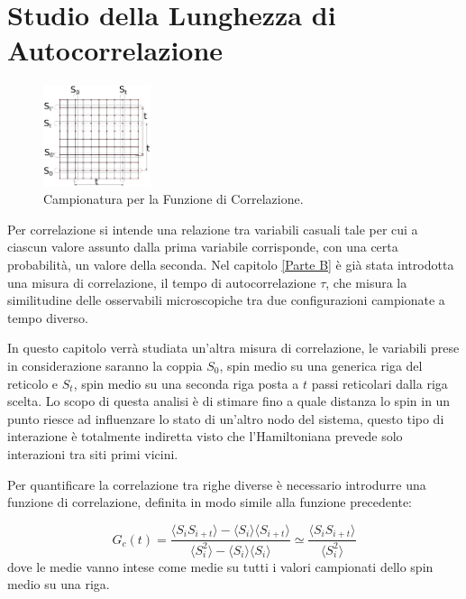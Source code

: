 \section{Studio della Lunghezza di Autocorrelazione}\label{Parte C}
\begin{figure}
\vspace{-25pt} 
  \begin{center}
	\includegraphics[width=0.28\textwidth]{Immagini/Reticolo}
  \end{center}
       \vspace{-15pt} 
       \caption[Campionatura per la Funzione di Correlazione.]{\footnotesize Campionatura per la Funzione di Correlazione.}\label{fig: simmetrie}
       \vspace{-15pt} 
\end{figure}

Per correlazione si intende una relazione tra variabili casuali tale per cui a ciascun valore assunto dalla prima variabile corrisponde, con una certa probabilità, un valore della seconda.
Nel capitolo \ref{Parte B} è già stata introdotta una misura di correlazione, il tempo di autocorrelazione $\tau$, che misura la similitudine delle osservabili microscopiche tra due configurazioni campionate a tempo diverso.

In questo capitolo verrà studiata un'altra misura di correlazione, le variabili prese in considerazione saranno la coppia $S_0$, spin medio su una  generica riga del reticolo e $S_t$, spin medio su una seconda riga posta a $t$ passi reticolari dalla riga scelta. 
Lo scopo di questa analisi è di stimare fino a quale distanza lo spin in un punto riesce ad influenzare lo stato di un'altro nodo del sistema, questo tipo di interazione è totalmente indiretta visto che l'Hamiltoniana prevede solo interazioni tra siti primi vicini.

Per quantificare la correlazione tra righe diverse è necessario introdurre una funzione di correlazione, definita in modo simile alla funzione precedente:

\begin{equation}\label{eq: G_c}
G_c(t) = \dfrac{\langle S_i S_{i+t}\rangle - \langle S_i\rangle \langle S_{i+t}\rangle  }{\langle S_i^2\rangle - \langle S_i\rangle \langle S_{i}\rangle} \simeq \dfrac{\langle S_i S_{i+t}\rangle}{\langle S_i^2\rangle}
\end{equation}
dove le medie vanno intese come medie su tutti i valori campionati dello spin medio su una riga.

